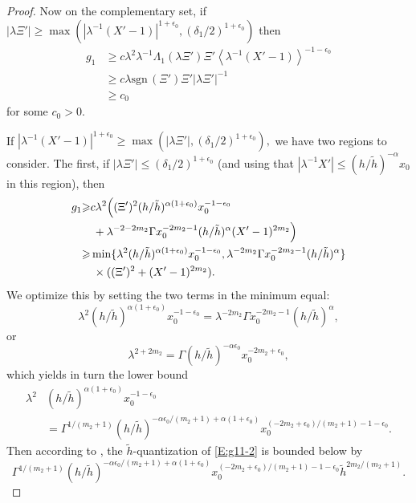 \documentclass[twoside, final]{amsart}
\theoremstyle{definition}
\numberwithin{equation}{section}
\begin{document}
\begin{proof}
Now on the complementary set, 
if ${{\left\lvert{{\lambda \Xi'}}\right\rvert}}{\geqslant}
 \max\left( {{\left\lvert{{ \lambda^{-1} (X'-1)}}\right\rvert}}^{1+{{\epsilon}}_0}, (\delta_1/2)^{1 + \epsilon_0} \right)$
then
\begin{align*}
g_1& {\geqslant} c \lambda^2 \lambda^{-1} \Lambda_1( \lambda \Xi') \Xi' {{\left\langle{{ \lambda^{-1} (X'-1) }}\right\rangle}}^{-1-{{\epsilon}}_0} \\
& {\geqslant} c\lambda {\mathrm{sgn}\,}( \Xi') \Xi' | \lambda  \Xi' |^{-1} \\
& {\geqslant} c_0
\end{align*}
for some $c_0 >0$.  

If ${{\left\lvert{{\lambda^{-1}  (X'-1) }}\right\rvert}}^{1+{{\epsilon}}_0}{\geqslant}
\max\left({{\left\lvert{{\lambda \Xi'}}\right\rvert}}, (\delta_1 /2)^{1 + {{\epsilon}}_0}\right),$ we
have two regions to consider.  The first, if 
 $| \lambda \Xi'| {\leqslant} (\delta_1 /2)^{1 + \epsilon_0}$ (and using that $| \lambda^{-1}
X' | {\leqslant} (h/{\tilde{h}})^{-\alpha} x_0$ in this region),
then
\begin{align}
g_1 & {\geqslant} c \lambda^2 \Big(  ( \Xi' )^2 (h/{\tilde{h}})^{\alpha(1 + \epsilon_0)}
x_0^{-1-\epsilon_0}  \notag \\
& \quad + \lambda^{-2-2m_2} \Gamma x_0^{-2m_2 -1}
(h/{\tilde{h}})^{\alpha} 
   (X'-1)^{2m_2} 
\Big) \\
& {\geqslant} \min \{ \lambda^2 (h/{\tilde{h}})^{\alpha(1 + \epsilon_0)}
x_0^{-1-\epsilon_0} , \lambda^{-2m_2} \Gamma  x_0^{-2m_2 -1}
(h/{\tilde{h}})^{\alpha}  \} \notag \\
& \quad \times ( ( \Xi')^2 + (X'-1)^{2m_2} ). \label{E:g11-2}
\end{align}
We optimize this by setting the two terms in the minimum equal:
\[
\lambda^2 (h/{\tilde{h}})^{\alpha(1 + \epsilon_0)}
x_0^{-1-\epsilon_0} = \lambda^{-2m_2} \Gamma  x_0^{-2m_2 -1}
(h/{\tilde{h}})^{\alpha} ,
\]
or
\[
\lambda^{2 + 2m_2} = \Gamma (h/{\tilde{h}})^{-\alpha \epsilon_0} x_0^{-2m_2 +
  \epsilon_0},
\]
which yields in turn the lower bound
\begin{align*}
\lambda^2 & (h/{\tilde{h}})^{\alpha(1 + \epsilon_0)}
x_0^{-1-\epsilon_0} \\
& = \Gamma^{1/(m_2 +1)} (h/{\tilde{h}})^{-\alpha \epsilon_0 /
  (m_2 +1) + \alpha(1 + \epsilon_0)} x_0^{(-2m_2 + \epsilon_0 )/(m_2
  +1)  -1-\epsilon_0} .
\end{align*}
Then according to \cite[Lemma A.2]{ChWu-lsm}, the ${\tilde{h}}$-quantization
of \eqref{E:g11-2} is bounded below by
\[
\Gamma^{1/(m_2 +1)} (h/{\tilde{h}})^{-\alpha \epsilon_0 /
  (m_2 +1) + \alpha(1 + \epsilon_0)} x_0^{(-2m_2 + \epsilon_0 )/(m_2
  +1)  -1-\epsilon_0} {\tilde{h}}^{2m_2/(m_2 +1)}.
\]


\end{proof}
\end{document}
